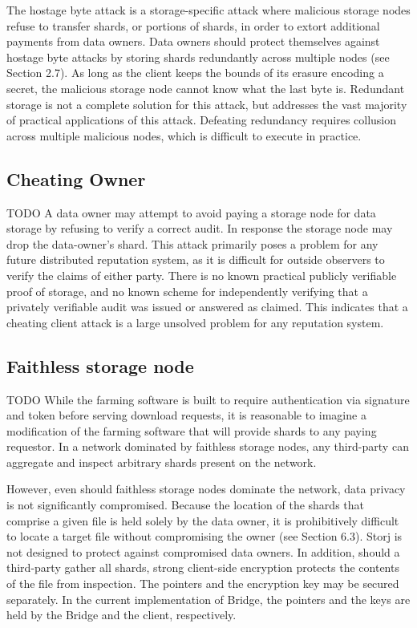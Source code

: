 \documentclass[a4paper,10pt]{article} \usepackage[utf8]{inputenc}
\newcommand{\todo}[1]{{\color{red} TODO #1 }}
\begin{document}
The hostage byte attack is a storage-specific attack where malicious storage 
nodes
refuse to transfer shards, or portions of shards, in order to extort additional
payments from data owners. Data owners should protect themselves against hostage
byte attacks by storing shards redundantly across multiple nodes (see Section
2.7). As long as the client keeps the bounds of its erasure encoding a secret,
the malicious storage node cannot know what the last byte is. Redundant storage 
is not
a complete solution for this attack, but addresses the vast majority of
practical applications of this attack. Defeating redundancy requires collusion
across multiple malicious nodes, which is difficult to execute in practice.

\subsection{Cheating Owner}

\todo{ A data owner may attempt to avoid paying a storage node for data storage 
by
refusing to verify a correct audit. In response the storage node may drop the
data-owner's shard. This attack primarily poses a problem for any future
distributed reputation system, as it is difficult for outside observers to
verify the claims of either party. There is no known practical publicly
verifiable proof of storage, and no known scheme for independently verifying
that a privately verifiable audit was issued or answered as claimed. This
indicates that a cheating client attack is a large unsolved problem for any
reputation system. }

\subsection{Faithless storage node}

\todo{ While the farming software is built to require authentication via
signature and token before serving download requests, it is reasonable to
imagine a modification of the farming software that will provide shards to any
paying requestor. In a network dominated by faithless storage nodes, any 
third-party
can aggregate and inspect arbitrary shards present on the network.

However, even should faithless storage nodes dominate the network, data privacy 
is not
significantly compromised. Because the location of the shards that comprise a
given file is held solely by the data owner, it is prohibitively difficult to
locate a target file without compromising the owner (see Section 6.3). Storj is
not designed to protect against compromised data owners. In addition, should a
third-party gather all shards, strong client-side encryption protects the
contents of the file from inspection. The pointers and the encryption key may be
secured separately. In the current implementation of Bridge, the pointers and
the keys are held by the Bridge and the client, respectively. }
\end{document}
